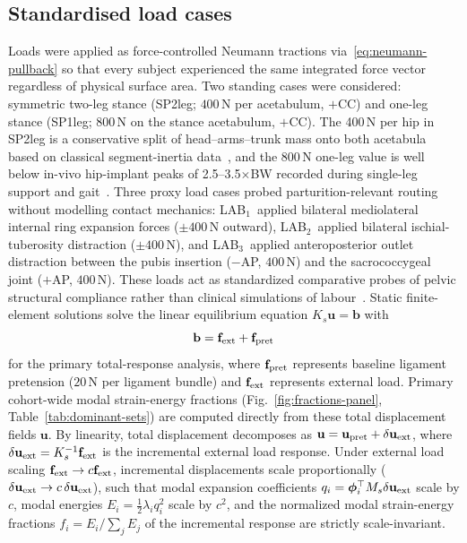 \documentclass[11pt]{article}
\newcommand{\LABone}{LAB$_1$}
\newcommand{\LABtwo}{LAB$_2$}
\newcommand{\LABthree}{LAB$_3$}
\begin{document}
\subsection{Standardised load cases}
\label{sec:loading}

Loads were applied as force-controlled Neumann tractions via~\eqref{eq:neumann-pullback} so that every subject experienced the same integrated force vector regardless of physical surface area.
Two standing cases were considered: symmetric two-leg stance (SP2leg; $400$\,N per acetabulum, $+$CC) and one-leg stance (SP1leg; $800$\,N on the stance acetabulum, $+$CC).
The 400\,N per hip in SP2leg is a conservative split of head--arms--trunk mass onto both acetabula based on classical segment-inertia data~\citep{deLeva1996}, and the 800\,N one-leg value is well below in-vivo hip-implant peaks of 2.5--3.5$\times$BW recorded during single-leg support and gait~\citep{Bergmann2001JBiomech,Kutzner2016PLOS}.
Three proxy load cases probed parturition-relevant routing without modelling contact mechanics: \LABone\ applied bilateral mediolateral internal ring expansion forces ($\pm 400$\,N outward), \LABtwo\ applied bilateral ischial-tuberosity distraction ($\pm 400$\,N), and \LABthree\ applied anteroposterior outlet distraction between the pubis insertion ($-$AP, $400$\,N) and the sacrococcygeal joint ($+$AP, $400$\,N).
These loads act as standardized comparative probes of pelvic structural compliance rather than clinical simulations of labour~\citep{ChenGrimm2021,Almeida2024Uterus}.
Static finite-element solutions solve the linear equilibrium equation $K_s \mathbf u = \mathbf b$ with
\begin{equation}
\mathbf b = \mathbf f_{\rm ext} + \mathbf f_{\rm pret}
\label{eq:total-load-vector}
\end{equation}
for the primary total-response analysis, where $\mathbf f_{\rm pret}$ represents baseline ligament pretension ($20$\,N per ligament bundle) and $\mathbf f_{\rm ext}$ represents external load.
Primary cohort-wide modal strain-energy fractions (Fig.~\ref{fig:fractions-panel}, Table~\ref{tab:dominant-sets}) are computed directly from these total displacement fields $\mathbf u$.
By linearity, total displacement decomposes as $\mathbf u = \mathbf u_{\rm pret} + \delta\mathbf u_{\rm ext}$, where $\delta\mathbf u_{\rm ext} = K_s^{-1}\mathbf f_{\rm ext}$ is the incremental external load response.
Under external load scaling $\mathbf f_{\rm ext} \to c\mathbf f_{\rm ext}$, incremental displacements scale proportionally ($\delta\mathbf u_{\rm ext} \to c\,\delta\mathbf u_{\rm ext}$), such that modal expansion coefficients $q_i = \boldsymbol\phi_i^\top M_s \delta\mathbf u_{\rm ext}$ scale by $c$, modal energies $E_i = \frac{1}{2}\lambda_i q_i^2$ scale by $c^2$, and the normalized modal strain-energy fractions $f_i = E_i / \sum_j E_j$ of the incremental response are strictly scale-invariant.
\end{document}
